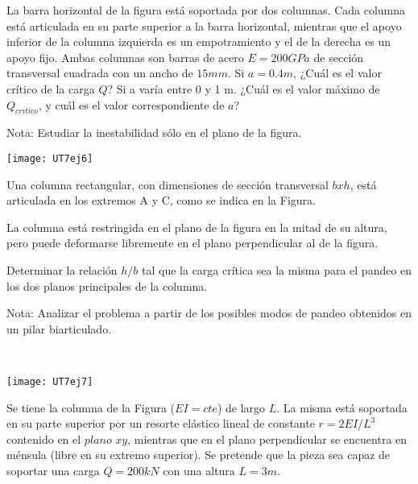 \ejercicio

La barra horizontal de la figura está soportada por dos columnas. Cada columna está articulada en su parte superior a la barra horizontal, mientras que el apoyo inferior de la columna izquierda es un empotramiento y el de la derecha es un apoyo fijo. Ambas columnas son barras de acero $E=200GPa$ de sección transversal cuadrada con un ancho de $15 mm$.
\parte Si $a=0.4m$, ¿Cuál es el valor crítico de la carga $Q$?
\parte Si a varía entre 0 y 1 m. ¿Cuál es el valor máximo de $Q_{critico}$, y cuál es el valor correspondiente de $a$?

Nota: Estudiar la inestabilidad sólo en el plano de la figura.

\begin{center}
\texttt{[image: UT7ej6]}
\end{center}

\ejercicio

\begin{minipage}[b]{0.6\textwidth}

Una columna rectangular, con dimensiones de sección transversal $bxh$, está articulada en los extremos A y C, como se indica en la Figura.

La columna está restringida en el plano de la figura en la mitad de su altura, pero puede deformarse libremente en el plano perpendicular al de la figura.

Determinar la relación $h/b$ tal que la carga crítica sea la misma para el pandeo en los dos planos principales de la columna.

Nota: Analizar el problema a partir de los posibles modos de pandeo obtenidos en un pilar biarticulado.

\end{minipage}
~
\begin{minipage}[b]{0.4\textwidth}
\begin{center}
\texttt{[image: UT7ej7]}
\end{center}
\end{minipage}

\ejercicio

Se tiene la columna de la Figura ($EI=cte$) de largo $L$. La misma está soportada en su parte superior por un resorte elástico lineal de constante $r=2EI/L^3$ contenido en el $plano$ $xy$, mientras que en el plano perpendicular se encuentra en ménsula (libre en su extremo superior). Se pretende que la pieza sea capaz de soportar una carga $Q=200 kN$ con una altura $L=3m$.

